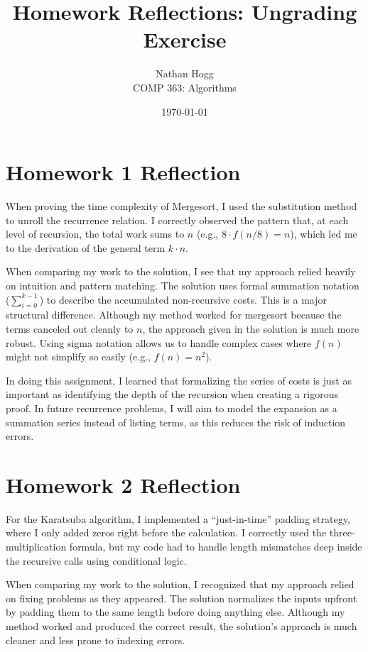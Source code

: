 \documentclass[11pt, letterpaper]{article}
\title{Homework Reflections: Ungrading Exercise}
\author{Nathan Hogg \\ COMP 363: Algorithms}
\date{\today}
\begin{document}
\maketitle

\section*{Homework 1 Reflection}

When proving the time complexity of Mergesort, I used the substitution method to unroll the recurrence relation. I correctly observed the pattern that, at each level of recursion, the total work sums to $n$ (e.g., $8 \cdot f(n/8) = n$), which led me to the derivation of the general term $k \cdot n$.

When comparing my work to the solution, I see that my approach relied heavily on intuition and pattern matching. The solution uses formal summation notation ($\sum_{i=0}^{k-1}$) to describe the accumulated non-recursive costs. This is a major structural difference. Although my method worked for mergesort because the terms canceled out cleanly to $n$, the approach given in the solution is much more robust. Using sigma notation allows us to handle complex cases where $f(n)$ might not simplify so easily (e.g., $f(n)=n^2$).

In doing this assignment, I learned that formalizing the series of costs is just as important as identifying the depth of the recursion when creating a rigorous proof. In future recurrence problems, I will aim to model the expansion as a summation series instead of listing terms, as this reduces the risk of induction errors.

\section*{Homework 2 Reflection}

For the Karatsuba algorithm, I implemented a ``just-in-time'' padding strategy, where I only added zeros right before the calculation. I correctly used the three-multiplication formula, but my code had to handle length mismatches deep inside the recursive calls using conditional logic.

When comparing my work to the solution, I recognized that  my approach relied on fixing problems as they appeared. The solution normalizes the inputs upfront by padding them to the same length before doing anything else.  Although my method worked and produced the correct result, the solution's approach is much cleaner and less prone to indexing errors.
\end{document}
